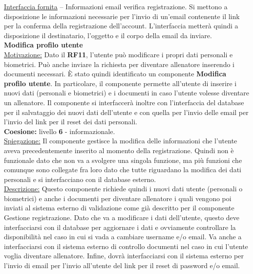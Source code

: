 \documentclass{article}
\begin{document}
      \underline{Interfaccia fornita} – Informazioni email verifica registrazione. Si mettono a disposizione le informazioni necessarie per l’invio di un’email contenente il link per
      la conferma della registrazione dell’account. L’interfaccia metterà quindi a disposizione il destinatario, l’oggetto e il corpo della email da inviare.\\


      {\Large\textbf{Modifica profilo utente}}\\

      \underline{Motivazione:} Dato il \textbf{RF11}, l’utente può modificare i propri dati personali e biometrici. Può anche inviare la richiesta per diventare allenatore inserendo i
      documenti necessari. È stato quindi identificato un componente \textbf{Modifica profilo utente}. In particolare, il componente permette all'utente di inserire i nuovi dati (personali e
      biometrici) e i documenti in caso l'utente volesse diventare un allenatore. Il componente si interfaccerà inoltre con l'interfaccia del database per il salvataggio dei nuovi
      dati dell'utente e con quella per l'invio delle email per l'invio del link per il reset dei dati personali.\\

      \textbf{Coesione:} livello \textbf{6} - informazionale.\\

      \underline{Spiegazione:} Il componente gestisce la modifica delle informazioni che l’utente aveva precedentemente inserito al momento della registrazione. Quindi non è
      funzionale dato che non va a svolgere una singola funzione, ma più funzioni che comunque sono collegate fra loro dato che tutte riguardano la modifica dei dati personali e si
      interfacciano con il database esterno.\\

      \underline{Descrizione:} Questo componente richiede quindi i nuovi dati utente (personali o biometrici) e anche i documenti per diventare allenatore i quali vengono poi inviati
      al sistema esterno di validazione come già descritto per il componente Gestione registrazione. Dato che va a modificare i dati dell’utente, questo deve interfacciarsi con il
      database per aggiornare i dati e ovviamente controllare la disponibilità nel caso in cui si vada a cambiare username e/o email. Va anche a interfacciarsi con il sistema esterno
      di controllo documenti nel caso in cui l’utente voglia diventare allenatore. Infine, dovrà interfacciarsi con il sistema esterno per l’invio di email per l’invio all’utente del
      link per il reset di password e/o email.\\
\end{document}
